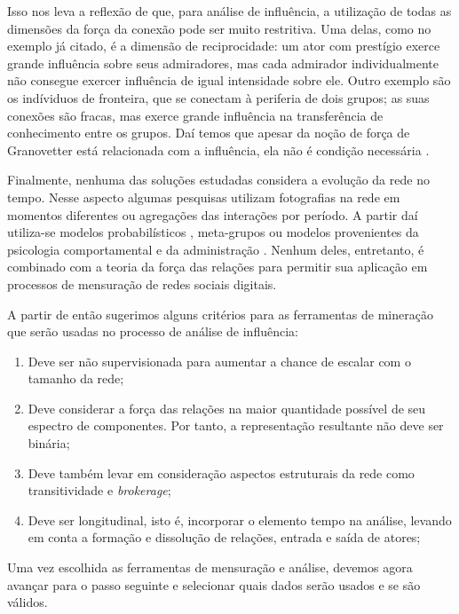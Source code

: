 Isso nos leva a reflexão de que, para análise de influência, a utilização de
todas as dimensões da força da conexão pode ser muito restritiva. Uma delas, como
no exemplo já citado, é a dimensão de reciprocidade: um ator com prestígio exerce
grande influência sobre seus admiradores, mas cada admirador individualmente não
consegue exercer influência de igual intensidade sobre ele. Outro exemplo são os
indíviduos de fronteira, que se conectam à periferia de dois grupos; as suas
conexões são fracas, mas exerce grande influência na transferência de
conhecimento entre os grupos. Daí temos que apesar da noção de força de
Granovetter está relacionada com a influência, ela não é condição necessária
\citep{Brown2007}.

Finalmente, nenhuma das soluções estudadas considera a evolução da rede no
tempo. Nesse aspecto algumas pesquisas utilizam fotografias na rede em
momentos diferentes ou agregações das interações por período. A partir daí
utiliza-se modelos probabilísticos \citep{Sarkar2005}, meta-grupos
\citep{Berger-Wolf2006} ou modelos provenientes da psicologia comportamental e da
administração \citep{Brelger2004}. Nenhum deles, entretanto, é combinado com
a teoria da força das relações para permitir sua aplicação em processos de
mensuração de redes sociais digitais.

A partir de então sugerimos alguns critérios para as ferramentas de mineração
que serão usadas no processo de análise de influência:

\begin{enumerate}
  \item Deve ser não supervisionada para aumentar a chance de escalar com o
  tamanho da rede;
  \item Deve considerar a força das relações na maior quantidade possível de seu
  espectro de componentes. Por tanto, a representação resultante não deve ser
  binária;
  \item Deve também levar em consideração aspectos estruturais da rede como
  transitividade e \emph{brokerage};
  \item Deve ser longitudinal, isto é, incorporar o elemento tempo na análise,
 levando em conta a formação e dissolução de relações, entrada e saída de
 atores;
\end{enumerate}

Uma vez escolhida as ferramentas de mensuração e análise, devemos agora avançar
para o passo seguinte e selecionar quais dados serão usados e se são válidos.


